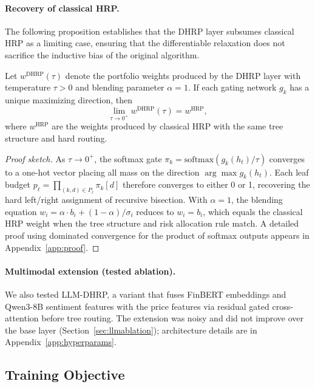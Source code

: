 \paragraph{Recovery of classical HRP.} The following proposition establishes that the DHRP layer subsumes classical HRP as a limiting case, ensuring that the differentiable relaxation does not sacrifice the inductive bias of the original algorithm.

\begin{proposition}
\label{prop:recovery}
Let $w^{\text{DHRP}}(\tau)$ denote the portfolio weights produced by the DHRP layer with temperature $\tau > 0$ and blending parameter $\alpha = 1$. If each gating network $g_k$ has a unique maximizing direction, then
\begin{equation}
\lim_{\tau \to 0^+} w^{\text{DHRP}}(\tau) = w^{\text{HRP}},
\end{equation}
where $w^{\text{HRP}}$ are the weights produced by classical HRP with the same tree structure and hard routing.
\end{proposition}

\begin{proof}[Proof sketch]
As $\tau \to 0^+$, the softmax gate $\pi_k = \text{softmax}(g_k(h_t)/\tau)$ converges to a one-hot vector placing all mass on the direction $\arg\max g_k(h_t)$. Each leaf budget $p_\ell = \prod_{(k,d) \in P_\ell} \pi_k[d]$ therefore converges to either 0 or 1, recovering the hard left/right assignment of recursive bisection. With $\alpha = 1$, the blending equation $w_i = \alpha \cdot b_i + (1-\alpha)/\sigma_i$ reduces to $w_i = b_i$, which equals the classical HRP weight when the tree structure and risk allocation rule match. A detailed proof using dominated convergence for the product of softmax outputs appears in Appendix~\ref{app:proof}.
\end{proof}

\paragraph{Multimodal extension (tested ablation).} We also tested LLM-DHRP, a variant that fuses FinBERT \citep{Huang2023} embeddings and Qwen3-8B \citep{Qwen2025} sentiment features with the price features via residual gated cross-attention before tree routing. The extension was noisy and did not improve over the base layer (Section~\ref{sec:llmablation}); architecture details are in Appendix~\ref{app:hyperparams}.

\subsection{Training Objective}

